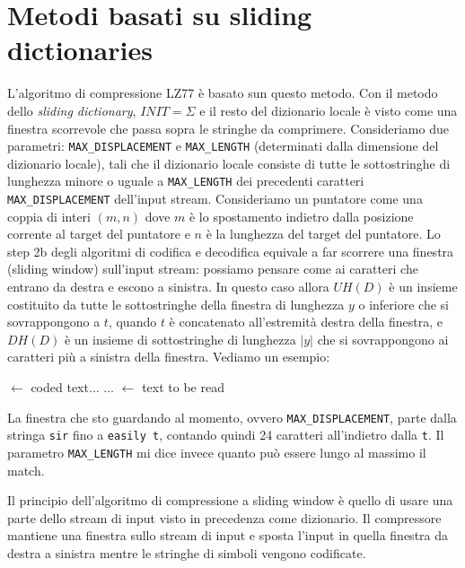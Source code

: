 \section{Metodi basati su sliding dictionaries}
L'algoritmo di compressione LZ77 è basato sun questo metodo. Con il metodo dello \textit{sliding dictionary}, \(INIT = \Sigma\) e il resto del dizionario locale è visto come una finestra scorrevole che passa sopra le stringhe da comprimere. Consideriamo due parametri: \texttt{MAX\_DISPLACEMENT} e \texttt{MAX\_LENGTH} (determinati dalla dimensione del dizionario locale), tali che il dizionario locale consiste di tutte le sottostringhe di lunghezza minore o uguale a \texttt{MAX\_LENGTH} dei precedenti caratteri \texttt{MAX\_DISPLACEMENT} dell'input stream. Consideriamo un puntatore come una coppia di interi \((m,n)\) dove \(m\) è lo spostamento indietro dalla posizione corrente al target del puntatore e \(n\) è la lunghezza del target del puntatore. Lo step 2b degli algoritmi di codifica e decodifica equivale a far scorrere una finestra (sliding window) sull'input stream: possiamo pensare come ai caratteri che entrano da destra e escono a sinistra. In questo caso allora \(UH(D)\) è un insieme costituito da tutte le sottostringhe della finestra di lunghezza \(y\) o inferiore che si sovrappongono a \(t\), quando \(t\) è concatenato all'estremità destra della finestra, e \(DH(D)\) è un insieme di sottostringhe di lunghezza \(|y|\) che si sovrappongono ai caratteri più a sinistra della finestra. Vediamo un esempio:

\vspace{5mm}

\begin{center}
    \(\leftarrow\) coded text\(\dots\)  \(\dots\) \(\leftarrow\) text to be read
\end{center}

La finestra che sto guardando al momento, ovvero \texttt{MAX\_DISPLACEMENT}, parte dalla stringa \texttt{sir} fino a \texttt{easily t}, contando quindi 24 caratteri all'indietro dalla \texttt{t}. Il parametro \texttt{MAX\_LENGTH} mi dice invece quanto può essere lungo al massimo il match. 

\vspace{5mm}

Il principio dell'algoritmo di compressione a sliding window è quello di usare una parte dello stream di input visto in precedenza come dizionario. Il compressore mantiene una finestra sullo stream di input e sposta l'input in quella finestra da destra a sinistra mentre le stringhe di simboli vengono codificate.  

